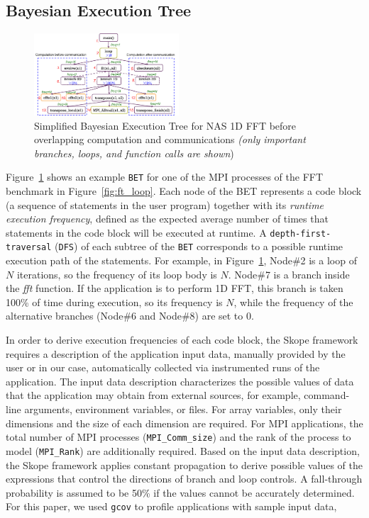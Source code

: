 \subsection {Bayesian Execution Tree}

\begin{figure}[h]
\begin{center}
\includegraphics[width=0.48\textwidth]{fig/ft_bet.png}
\caption{Simplified Bayesian Execution Tree for NAS 1D FFT before
  overlapping computation and communications \emph{(only important branches, loops, and function calls are shown})}
\label{fig:ft_bet}
\end{center}
\end{figure}

Figure~\ref{fig:ft_bet} shows an example \texttt{BET} for one of the
MPI processes of the FFT benchmark in Figure~\ref{fig:ft_loop}.
Each node of the BET represents a code block (a sequence of statements
in the user program) together with its \emph{runtime execution
  frequency}, defined as the expected average number of times that
statements in the code block will be executed at runtime.  A
\texttt{depth-first-traversal} (\texttt{DFS}) of each subtree of the
\texttt{BET} corresponds to a possible runtime execution path of the
statements.  For example, in Figure~\ref{fig:ft_bet}, Node\#2 is a
loop of $N$ iterations, so the frequency of its loop body is $N$.
Node\#7 is a branch inside the {\em fft} function. If the application is
to perform 1D FFT, this branch is taken 100\% of time during
execution, so its frequency is $N$, while the frequency of the
alternative branches (Node\#6 and Node\#8) are set to 0.

In order to derive execution frequencies of each code block, the Skope
framework requires a description of the application input data,
manually provided by the user or in our case,  automatically collected via 
instrumented runs of the application.  The input data description
characterizes the possible values of data that the application
may obtain from external sources, for example, command-line arguments,
environment variables, or files.  For array variables, only their
dimensions and the size of each dimension are required.  For MPI
applications, the total number of MPI processes
(\texttt{MPI\_Comm\_size}) and the rank of the process to model
(\texttt{MPI\_Rank}) are additionally required.  Based on the input
data description, the Skope framework applies constant propagation to
derive possible values of the expressions that control the directions
of branch and loop controls. A fall-through probability is assumed to be 50\% if the values cannot be accurately determined.  For this
paper, we used \texttt{gcov} to profile applications with sample input
data,


